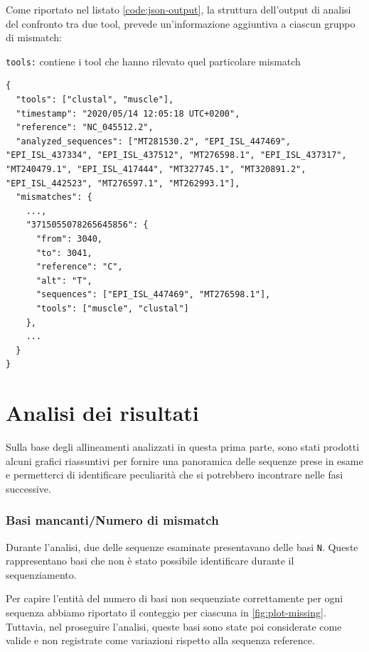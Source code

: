 \documentclass[11pt,italian]{article}
\makeatletter
\newcommand*{\lstitem}[1][]{%
  \setbox0\hbox\bgroup
    \patchcmd{\lst@InlineM}{\@empty}{\@empty\egroup\item[\usebox0]\leavevmode\ignorespaces}{}{}%
    \lstinline[#1]%
}
\makeatother
\begin{document}
\noindent
Come riportato nel listato \ref{code:json-output}, la struttura dell'output di analisi del confronto tra due tool, prevede un'informazione aggiuntiva a ciascun gruppo di mismatch:
\begin{description}
  \lstitem{tools:} contiene i tool che hanno rilevato quel particolare mismatch
\end{description}

\begin{lstlisting}[basicstyle=\small\ttfamily,caption=Esempio di output,label=code:json-output]
{
  "tools": ["clustal", "muscle"],
  "timestamp": "2020/05/14 12:05:18 UTC+0200",
  "reference": "NC_045512.2",
  "analyzed_sequences": ["MT281530.2", "EPI_ISL_447469", "EPI_ISL_437334", "EPI_ISL_437512", "MT276598.1", "EPI_ISL_437317", "MT240479.1", "EPI_ISL_417444", "MT327745.1", "MT320891.2", "EPI_ISL_442523", "MT276597.1", "MT262993.1"],
  "mismatches": {
    ...,
    "3715055078265645856": {
      "from": 3040,
      "to": 3041,
      "reference": "C",
      "alt": "T",
      "sequences": ["EPI_ISL_447469", "MT276598.1"],
      "tools": ["muscle", "clustal"]
    },
    ...
  }
}
\end{lstlisting}
\newpage

\section{Analisi dei risultati}
Sulla base degli allineamenti analizzati in questa prima parte, sono stati prodotti alcuni grafici riassuntivi per fornire una panoramica delle sequenze prese in esame e permetterci di identificare peculiarità che si potrebbero incontrare nelle fasi successive.

\subsubsection*{Basi mancanti/Numero di mismatch}
Durante l'analisi, due delle sequenze esaminate presentavano delle basi \lstinline{N}. Queste rappresentano basi che non è stato possibile identificare durante il sequenziamento.

Per capire l'entità del numero di basi non sequenziate correttamente per ogni sequenza abbiamo riportato il conteggio per ciascuna in \cref{fig:plot-missing}.
Tuttavia, nel proseguire l'analisi, queste basi sono state poi considerate come valide e non registrate come variazioni rispetto alla sequenza reference.
\end{document}
